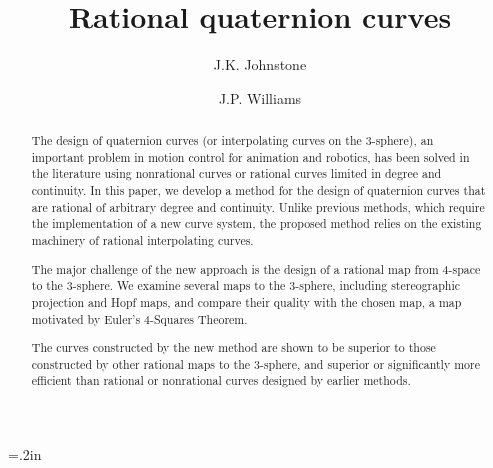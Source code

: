 \newtheorem{rmk}{Remark}[section]
\newtheorem{example}{Example}[section]
\newtheorem{conjecture}{Conjecture}[section]
\newtheorem{claim}{Claim}[section]
\newtheorem{notation}{Notation}[section]
\newtheorem{theorem}{Theorem}[section]
\newtheorem{lemma}[theorem]{Lemma}
\newtheorem{corollary}[theorem]{Corollary}
\newtheorem{defn2}{Definition}[section]


\SingleSpace

\setlength{\oddsidemargin}{0pt}
\setlength{\topmargin}{-.25in}	%
\setlength{\headsep}{0pt}
\setlength{\textheight}{8.75in}
\setlength{\textwidth}{6.5in}
\setlength{\columnsep}{5mm}		%


\title{Rational quaternion curves}
\author{J.K. Johnstone \and J.P. Williams}



\maketitle
\tableofcontents
\clearpage
\parskip=.2in
\parindent=0pt
\DoubleSpace

\begin{abstract}
The design of quaternion curves (or interpolating curves on the 3-sphere),
an important problem in motion control for animation and robotics,
has been solved in the literature using nonrational curves
or rational curves limited in degree and continuity.
In this paper, we develop a method for the design of quaternion
curves that are rational of arbitrary degree and continuity.
Unlike previous methods, which require the implementation of a new curve
system, the proposed method relies on the existing machinery of 
rational interpolating curves.

The major challenge of the new approach is the design of a rational
map from 4-space to the 3-sphere.
We examine several maps to the 3-sphere, including stereographic projection
and Hopf maps, and compare their quality with the chosen map,
a map motivated by Euler's 4-Squares Theorem.

The curves constructed by the new method are shown to be superior
to those constructed by other rational maps to the 3-sphere,
and superior or significantly more efficient than rational or 
nonrational curves designed by earlier methods.
\end{abstract}

